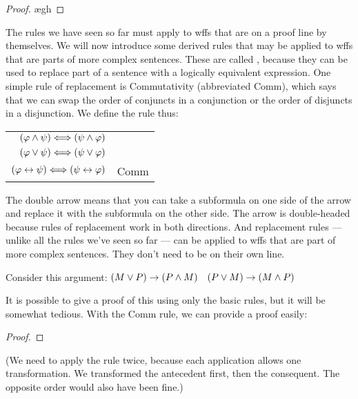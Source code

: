 \begin{proof}
	 \pr{}
	\open
		\ae{gh}
	\close
\end{proof}

The rules we have seen so far must apply to wffs that are on a proof line by themselves. We will now introduce some derived rules that may be applied to wffs that are parts of more complex sentences. These are called , because they can be used to replace part of a sentence with a logically equivalent expression. One simple rule of replacement is Commutativity (abbreviated Comm), which says that we can swap the order of conjuncts in a conjunction or the order of disjuncts in a disjunction. We define the rule thus:

\begin{center}
\begin{tabular}{rl}
$(\varphi{}\wedge\psi{}) \Longleftrightarrow (\psi{}\wedge\varphi{})$\\
$(\varphi{}\vee\psi{}) \Longleftrightarrow (\psi{}\vee\varphi{})$\\
$(\varphi{}\leftrightarrow\psi{}) \Longleftrightarrow (\psi{}\leftrightarrow\varphi{})$
& Comm
\end{tabular}
\end{center}

The double arrow means that you can take a subformula on one side of the arrow and replace it with the subformula on the other side. The arrow is double-headed because rules of replacement work in both directions. And replacement rules --- unlike all the rules we've seen so far --- can be applied to wffs that are part of more complex sentences. They don't need to be on their own line.

Consider this argument: $(M \vee P) \rightarrow (P \wedge M)$ \therefore\ $(P \vee M) \rightarrow (M \wedge P)$

It is possible to give a proof of this using only the basic rules, but it will be somewhat tedious. With the Comm rule, we can provide a proof easily:

\begin{proof}
	 \pr{}
\end{proof}

(We need to apply the rule twice, because each application allows one transformation. We transformed the antecedent first, then the consequent. The opposite order would also have been fine.)

